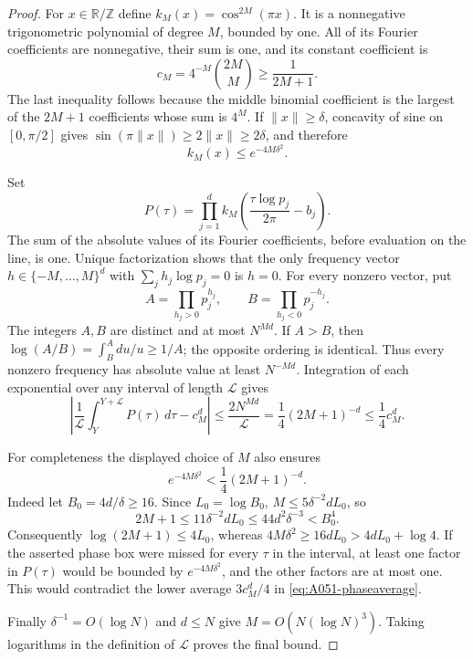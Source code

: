 \begin{proof}
For \(x\in\mathbb R/\mathbb Z\) define
\(k_M(x)=\cos^{2M}(\pi x)\).
It is a nonnegative trigonometric polynomial of degree \(M\),
bounded by one. All of its Fourier coefficients are nonnegative,
their sum is one, and its constant coefficient is
\[
       c_M=4^{-M}\binom{2M}{M}\ge\frac1{2M+1}.
\]
The last inequality follows because the middle binomial coefficient
is the largest of the \(2M+1\) coefficients whose sum is \(4^M\).
If \(\|x\|\ge\delta\), concavity of sine on \([0,\pi/2]\) gives
\(\sin(\pi\|x\|)\ge2\|x\|\ge2\delta\), and therefore
\[
                    k_M(x)\le e^{-4M\delta^2}.
\]

Set
\[
 P(\tau)=\prod_{j=1}^d
       k_M\!\left(\frac{\tau\log p_j}{2\pi}-b_j\right).
\]
The sum of the absolute values of its Fourier coefficients, before
evaluation on the line, is one. Unique factorization shows that
the only frequency vector \(h\in\{-M,\ldots,M\}^d\) with
\(\sum_jh_j\log p_j=0\) is \(h=0\).
For every nonzero vector, put
\[
 A=\prod_{h_j>0}p_j^{h_j},\qquad
 B=\prod_{h_j<0}p_j^{-h_j}.
\]
The integers \(A,B\) are distinct and at most \(N^{Md}\).
If \(A>B\), then
\(\log(A/B)=\int_B^Adu/u\ge1/A\); the opposite ordering is
identical. Thus every nonzero frequency has absolute value at least
\(N^{-Md}\). Integration of each exponential over any interval
of length \(\mathcal L\) gives
\begin{equation}\label{eq:A051-phaseaverage}
 \left|\frac1{\mathcal L}\int_Y^{Y+\mathcal L}P(\tau)\,d\tau
                        -c_M^d\right|
       \le\frac{2N^{Md}}{\mathcal L}
       =\frac14(2M+1)^{-d}\le\frac14c_M^d.
\end{equation}

For completeness the displayed choice of \(M\) also ensures
\[
                    e^{-4M\delta^2}
                              <\frac14(2M+1)^{-d}.
\]
Indeed let \(B_0=4d/\delta\ge16\). Since \(L_0=\log B_0\),
\(M\le5\delta^{-2}dL_0\), so
\[
 2M+1\le11\delta^{-2}dL_0
          \le44d^2\delta^{-3}<B_0^4.
\]
Consequently \(\log(2M+1)\le4L_0\), whereas
\(4M\delta^2\ge16dL_0>4dL_0+\log4\).
If the asserted phase box were missed for every \(\tau\) in the
interval, at least one factor in \(P(\tau)\) would be bounded by
\(e^{-4M\delta^2}\), and the other factors are at most one.
This would contradict the lower average
\(3c_M^d/4\) in \eqref{eq:A051-phaseaverage}.

Finally \(\delta^{-1}=O(\log N)\) and \(d\le N\) give
\(M=O(N(\log N)^3)\). Taking logarithms in the definition of
\(\mathcal L\) proves the final bound.
\end{proof}

